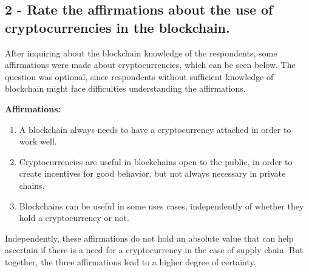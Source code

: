 \subsection*{2 - Rate the affirmations about the use of cryptocurrencies in the blockchain.}

After inquiring about the blockchain knowledge of the respondents, some affirmations were made about cryptocurrencies, which can be seen below. The question was optional, since respondents without sufficient knowledge of blockchain might face difficulties understanding the affirmations.


\textbf{Affirmations: }
\begin{enumerate}
\item A blockchain always needs to have a cryptocurrency attached in order to work well.
\item Cryptocurrencies are useful in blockchains open to the public, in order to create incentives for good behavior, but not always necessary in private chains.
\item Blockchains can be useful in some uses cases, independently of whether they hold a cryptocurrency or not.
\end{enumerate}

Independently, these affirmations do not hold an absolute value that can help ascertain if there is a need for a cryptocurrency in the case of supply chain. But together, the three affirmations lead to a higher degree of certainty.

